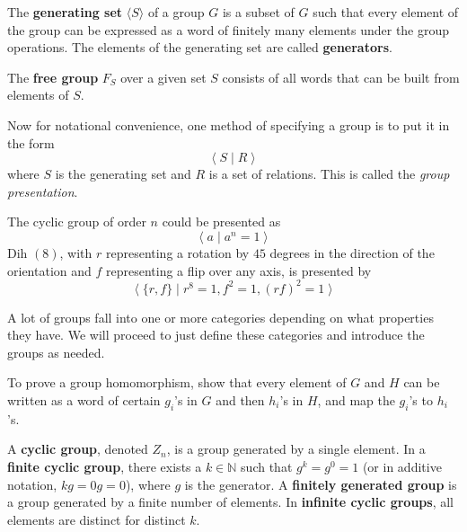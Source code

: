   \begin{definition}
    The \textbf{generating set} $\langle S \rangle$ of a group $G$ is a subset of $G$ such that every element of the group can be expressed as a word of finitely many elements under the group operations. The elements of the generating set are called \textbf{generators}.
  \end{definition}

  \begin{definition}
    The \textbf{free group} $F_{S}$ over a given set $S$ consists of all words that can be built from elements of $S$. 
  \end{definition}

  Now for notational convenience, one method of specifying a group is to put it in the form
  \begin{equation}
    \big\langle \; S \; | \; R \;\big\rangle
  \end{equation}
  where $S$ is the generating set and $R$ is a set of relations. This is called the \textit{group presentation}. 

  \begin{example}
    The cyclic group of order $n$ could be presented as
    \begin{equation}
      \big\langle \; a \; | \; a^{n} = 1 \;\big\rangle
    \end{equation}
    Dih $(8)$, with $r$ representing a rotation by $45$ degrees in the direction of the orientation and $f$ representing a flip over any axis, is presented by
    \begin{equation}
      \big\langle \; \{ r, f\} \; | \; r^{8} = 1, f^{2} = 1, (r f)^{2} = 1 \;\big\rangle
    \end{equation}
  \end{example}

  A lot of groups fall into one or more categories depending on what properties they have. We will proceed to just define these categories and introduce the groups as needed. 


  \begin{theorem}[Tip]
    To prove a group homomorphism, show that every element of $G$ and $H$ can be written as a word of certain $g_i$'s in $G$ and then $h_i$'s in $H$, and map the $g_i$'s to $h_i$'s. 
  \end{theorem}

  \begin{definition}
    A \textbf{cyclic group}, denoted $Z_{n}$, is a group generated by a single element. In a \textbf{finite cyclic group}, there exists a $k \in \mathbb{N}$ such that $g^{k} = g^{0} = 1$ (or in additive notation, $kg = 0g = 0$), where $g$ is the generator. A \textbf{finitely generated group} is a group generated by a finite number of elements. In \textbf{infinite cyclic groups}, all elements are distinct for distinct $k$. 
  \end{definition} 

